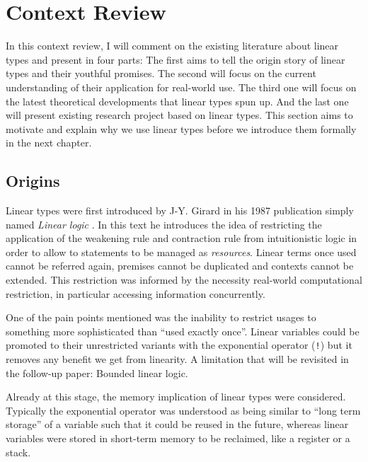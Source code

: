 \documentclass[
]{article}
\begin{document}
\newpage

\hypertarget{context-review}{%
\section{Context Review}\label{context-review}}

In this context review, I will comment on the existing literature about
linear types and present in four parts: The first aims to tell the
origin story of linear types and their youthful promises. The second
will focus on the current understanding of their application for
real-world use. The third one will focus on the latest theoretical
developments that linear types spun up. And the last one will present
existing research project based on linear types. This section aims to
motivate and explain why we use linear types before we introduce them
formally in the next chapter.

\hypertarget{origins}{%
\subsection{Origins}\label{origins}}

Linear types were first introduced by J-Y. Girard in his
1987\cite{linear-logic} publication simply named \emph{Linear logic} .
In this text he introduces the idea of restricting the application of
the weakening rule and contraction rule from intuitionistic logic in
order to allow to statements to be managed as \emph{resources}. Linear
terms once used cannot be referred again, premises cannot be duplicated
and contexts cannot be extended. This restriction was informed by the
necessity real-world computational restriction, in particular accessing
information concurrently.

One of the pain points mentioned was the inability to restrict usages to
something more sophisticated than ``used exactly once''. Linear
variables could be promoted to their unrestricted variants with the
exponential operator (\texttt{!}) but it removes any benefit we get from
linearity. A limitation that will be revisited in the follow-up paper:
Bounded linear logic.

Already at this stage, the memory implication of linear types were
considered. Typically the exponential operator was understood as being
similar to ``long term storage'' of a variable such that it could be
reused in the future, whereas linear variables were stored in short-term
memory to be reclaimed, like a register or a stack.
\end{document}
